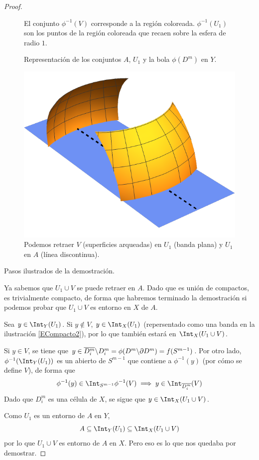 \begin{proof}
\begin{marginfigure}
\begin{subfigure}[b]{\textwidth}

\caption{ El conjunto $\phi^{-1}(V)$ corresponde a la
región coloreada. $\phi^{-1}(U_1)$ son los puntos de la región coloreada que
recaen sobre la esfera de radio $1$.}
\end{subfigure}
\begin{subfigure}[b]{\textwidth}

\caption{Representación de los conjuntos $A$, $U_1$ y la bola $\phi(D^m)$ en
	$Y$.}
\end{subfigure}
\begin{subfigure}[b]{\textwidth}
\includegraphics{Figures/ECompacto2.pdf}
\caption{ Podemos retraer $V$ (superficies arqueadas) en
$U_1$ (banda plana) y $U_1$ en $A$ (línea discontinua).}
\end{subfigure}
\caption{Pasos ilustrados de la demostración.}
\end{marginfigure}

Ya sabemos que $U_1 \cup V$ se puede retraer en $A$. Dado que es unión de
compactos, es trivialmente compacto, de forma que habremos terminado la
demostración si podemos probar que $U_1 \cup V$ es entorno en $X$ de $A$.

Sea $y \in \Int_Y(U_1)$. Si $y \not\in V$, $y \in \Int_X(U_1)$
(repersentado como una banda en la ilustración \ref{ECompacto2}), por lo que
también estará en $\Int_X(U_1 \cup V)$.

Si $y \in V$, se tiene que $y \in \overline{D^m_i}\backslash D^m_i=
\phi(D^m\backslash \partial D^m)=f(S^{m-1})$. Por otro lado,
$\phi^{-1}(\Int_Y(U_1))$ es un abierto de $S^{m-1}$ que contiene a
$\phi^{-1}(y)$ (por cómo se define $V$), de forma que 
\[\phi^{-1}(y) \in \Int_{S^{m-1}}\phi^{-1}(V) \implies y \in
\Int_{\overline{D^m_i}}(V)\]
Dado que $D^m_i$ es una célula de $X$, se sigue que $y \in
\Int_X(U_1\cup V)$.

Como $U_1$ es un entorno de $A$ en $Y$,
\[A \subseteq \Int_Y(U_1)\subseteq \Int_X(U_1\cup V)\]
por lo que $U_1\cup V$ es entorno de $A$ en $X$. Pero eso es lo que nos
quedaba por demostrar.
\end{proof}

